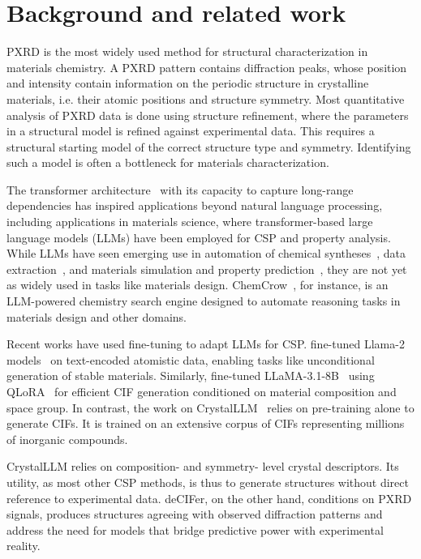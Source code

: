 \section{Background and related work}
PXRD is the most widely used method for structural characterization in materials chemistry. A PXRD pattern contains diffraction peaks, whose position and intensity contain information on the periodic structure in crystalline materials, i.e. their atomic positions and structure symmetry. Most quantitative analysis of PXRD data is done using structure refinement, where the parameters in a structural model is refined against experimental data. This requires a structural starting model of the correct structure type and symmetry. Identifying such a model is often a bottleneck for materials characterization.

The transformer architecture~\cite{vaswani2017attentionneed} with its capacity to capture long-range dependencies has inspired applications beyond natural language processing, including applications in materials science, where transformer-based large language models (LLMs) have been employed for CSP and property analysis. While LLMs have seen emerging use in automation of chemical syntheses~\cite{hocky2022natural, szymanski2023autonomous, m2024augmenting}, data extraction~\cite{gupta2022matscibert, dagdelen2024structured, polak2024extracting, schilling2025text}, and materials simulation and property prediction~\cite{zhang_dpa-2_2024, rubungo2024llmmatbench, jablonka2024leveraging}, they are not yet as widely used in tasks like materials design. ChemCrow~\cite{m2024augmenting}, for instance, is an LLM-powered chemistry search engine designed to automate reasoning tasks in materials design and other domains.

Recent works have used fine-tuning to adapt LLMs for CSP. \citet{gruver2024finetuned} fine-tuned Llama-2 models~\cite{touvron2023llama} on text-encoded atomistic data, enabling tasks like unconditional generation of stable materials. Similarly, \citet{mohanty2024crystext} fine-tuned LLaMA-3.1-8B~\cite{dubey2024llama} using QLoRA~\cite{dettmers2024qlora} for efficient CIF generation conditioned on material composition and space group. In contrast, the work on CrystalLLM~\cite{antunes2024crystalstructuregenerationautoregressive} relies on pre-training alone to generate CIFs. It is trained on an extensive corpus of CIFs representing millions of inorganic compounds. 

CrystalLLM relies on composition- and symmetry- level crystal descriptors. Its utility, as most other CSP methods, is thus to generate structures without direct reference to experimental data. deCIFer, on the other hand, conditions on PXRD signals, produces structures agreeing with observed diffraction patterns and address the need for models that bridge predictive power with experimental reality.


